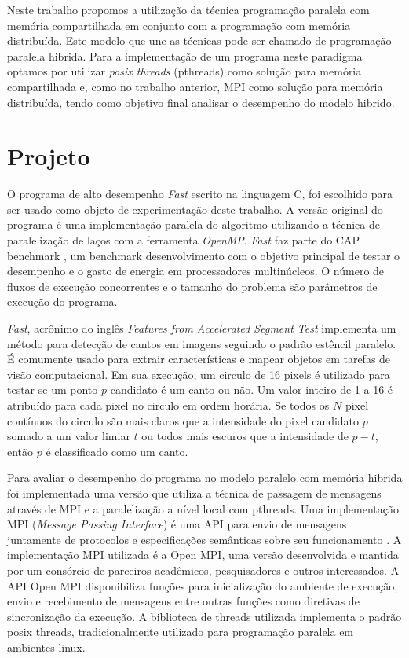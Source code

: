 \documentclass[12pt]{article}
\begin{document}
Neste trabalho propomos a utilização da técnica programação paralela com memória compartilhada em conjunto com a programação com memória distribuída. Este modelo que une as técnicas pode ser chamado de programação paralela hibrida. Para a implementação de um programa neste paradigma optamos por utilizar \textit{posix threads} (pthreads) como solução para memória compartilhada e, como no trabalho anterior, MPI como solução para memória distribuída, tendo como objetivo final analisar o desempenho do modelo hibrido.


\section{Projeto} \label{sec:projeto}

O programa de alto desempenho \textit{Fast} escrito na linguagem C, foi escolhido para ser usado como objeto de experimentação deste trabalho. A versão original do programa é uma implementação paralela do algoritmo utilizando a técnica de paralelização de laços com a ferramenta \textit{OpenMP}. \textit{Fast} faz parte do CAP benchmark \cite{souza2017cap}, um benchmark desenvolvimento com o objetivo principal de testar o desempenho e o gasto de energia em processadores multinúcleos. O número de fluxos de execução concorrentes e o tamanho do problema são parâmetros de execução do programa.

\textit{Fast}, acrônimo do inglês \textit{Features from Accelerated Segment Test} implementa um método para detecção de cantos em imagens seguindo o padrão estêncil paralelo. É comumente usado para extrair características e mapear objetos em tarefas de visão computacional. Em sua execução, um circulo de 16 pixels é utilizado para testar se um ponto \(p\) candidato é um canto ou não. Um valor inteiro de 1 a 16 é atribuído para cada pixel no circulo em ordem horária. Se todos os \(N\) pixel contínuos do circulo são mais claros que a intensidade do pixel candidato \(p\) somado a um valor limiar \(t\) ou todos mais escuros que a intensidade de \(p - t \), então \(p\) é classificado como um canto.
	
Para avaliar o desempenho do programa no modelo paralelo com memória hibrida foi implementada uma versão que utiliza a técnica de passagem de mensagens através de MPI e a paralelização a nível local com pthreads. Uma implementação MPI (\textit{Message Passing Interface}) é uma API para envio de mensagens juntamente de protocolos e especificações semânticas sobre seu funcionamento \cite{Lusk96ahigh-performance}. A implementação MPI utilizada é a Open MPI, uma versão desenvolvida e mantida por um consórcio de parceiros acadêmicos, pesquisadores e outros interessados. A API Open MPI disponibiliza funções para inicialização do ambiente de execução, envio e recebimento de mensagens entre outras funções como diretivas de sincronização da execução. A biblioteca de threads utilizada implementa o padrão posix threads, tradicionalmente utilizado para programação paralela em ambientes linux.
\end{document}
